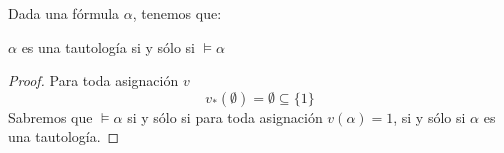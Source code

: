 \begin{ejercicio}
    Dada una fórmula $\alpha$, tenemos que:
    \begin{center}
        $\alpha$ es una tautología si y sólo si $\vDash\alpha$
    \end{center}
    
    \begin{proof}
        Para toda asignación $v$ 
        \begin{equation*}
            v_*(\emptyset ) = \emptyset \subseteq \{1\}
        \end{equation*}
        Sabremos que $\vDash\alpha$ si y sólo si para toda asignación $v(\alpha)=1$, si y sólo si $\alpha$ es una tautología.
    \end{proof}
    
\end{ejercicio}

